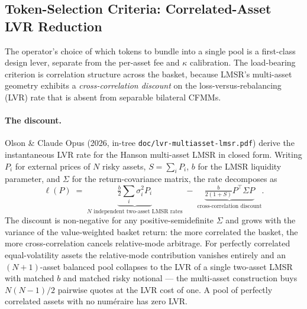 \documentclass[11pt]{article}
\begin{document}
\subsection{Token-Selection Criteria: Correlated-Asset LVR Reduction}
\label{sec:token-selection}

The operator's choice of which tokens to bundle into a single pool is a
first-class design lever, separate from the per-asset fee and $\kappa$
calibration. The load-bearing criterion is correlation structure across
the basket, because LMSR's multi-asset geometry exhibits a
\emph{cross-correlation discount} on the loss-versus-rebalancing (LVR)
rate that is absent from separable bilateral CFMMs.

\paragraph{The discount.}
Olson \& Claude Opus (2026, in-tree
\texttt{doc/lvr-multiasset-lmsr.pdf}) derive the instantaneous LVR rate
for the Hanson multi-asset LMSR in closed form. Writing $P_i$ for
external prices of $N$ risky assets, $S = \sum_i P_i$, $b$ for the LMSR
liquidity parameter, and $\Sigma$ for the return-covariance matrix, the
rate decomposes as
\[
  \ell(P)
    \;=\;
    \underbrace{\tfrac{b}{2}\sum_i \sigma_i^2 P_i}_{\text{$N$ independent two-asset LMSR rates}}
    \;-\;
    \underbrace{\tfrac{b}{2(1 + S)} P^{\!\top}\!\Sigma P}_{\text{cross-correlation discount}}.
\]
The discount is non-negative for any positive-semidefinite $\Sigma$ and
grows with the variance of the value-weighted basket return: the more
correlated the basket, the more cross-correlation cancels relative-mode
arbitrage. For perfectly correlated equal-volatility assets the
relative-mode contribution vanishes entirely and an $(N{+}1)$-asset
balanced pool collapses to the LVR of a single two-asset LMSR with
matched $b$ and matched risky notional --- the multi-asset construction
buys $N(N{-}1)/2$ pairwise quotes at the LVR cost of one. A pool of
perfectly correlated assets with no num\'eraire has zero LVR.
\end{document}
